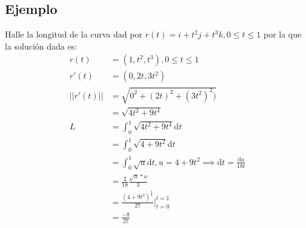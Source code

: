 \documentclass{article}
\begin{document}
\subsection*{Ejemplo}

Halle la longitud de la curva dad por
$ r(t) = i + t^2j + t^3k, 0 \leq t \leq 1 $ por la que la solución dada es:
\begin{align}
	r(t)        & = (1, t^2, t^3), 0 \leq t \leq 1                                                             \\
	r'(t)       & = (0, 2t, 3t^2)                                                                              \\
	|| r'(t) || & = \sqrt{0^2 + (2t)^2 + (3t^2)^2)}                                                            \\
	            & = \sqrt{4t^2 + 9t^4}                                                                         \\
	L           & = \int_0^1 \sqrt{4t^2 + 9t^4} \mathrm{d}t                                                    \\
	            & = \int_0^1 \sqrt{4 + 9t^2} \mathrm{d}t                                                       \\
	            & = \int_0^1 \sqrt{u} \mathrm{d}t, u = 4 + 9t^2 \implies \mathrm{d}t = \frac{\mathrm{d}u}{18t} \\
	            & = \frac{2}{18} \frac{\sqrt{u}*u}{3}                                                          \\
	            & = \frac{(4 + 9t^2)^{\frac{3}{2}}}{27} \Biggr|_{t=0}^{t=1}                                    \\
	            & = \frac{-8}{27}                                                                              \\
\end{align}

\section{}
\end{document}
